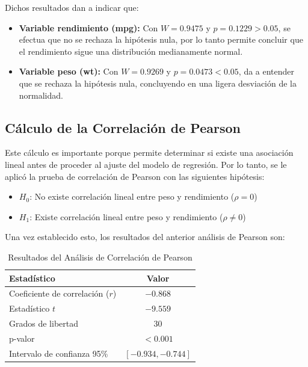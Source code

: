 \documentclass[12pt, letterpaper]{article}
\begin{document}
    \newpage
    Dichos resultados dan a indicar que:

    \begin{itemize}
        \item \textbf{Variable rendimiento (mpg):} Con $W = 0.9475$ y $p = 0.1229 > 0.05$, se efectua que no se rechaza la hipótesis nula, por lo tanto permite concluir que el rendimiento sigue una distribución medianamente normal.
        \item \textbf{Variable peso (wt):} Con $W = 0.9269$ y $p = 0.0473 < 0.05$, da a entender que
            se rechaza la hipótesis nula, concluyendo en una ligera desviación de la
            normalidad.
    \end{itemize}

    

    \subsection{Cálculo de la Correlación de Pearson}

    Este cálculo es importante porque permite determinar si existe una asociación lineal antes de proceder al ajuste del modelo de regresión. Por lo tanto, se le aplicó la prueba de correlación de Pearson con las siguientes hipótesis:
    \begin{itemize}
        \item $H_0$: No existe correlación lineal entre peso y rendimiento ($\rho = 0$)
        \item $H_1$: Existe correlación lineal entre peso y rendimiento ($\rho \neq 0$)
    \end{itemize}

    Una vez establecido esto, los resultados del anterior análisis de Pearson son:

    \begin{table}[H]
        \centering
        \caption{Resultados del Análisis de Correlación de Pearson}
        \begin{tabular}{@{}lc@{}}
            \toprule 
            \textbf{Estadístico} & \textbf{Valor} \\
            \midrule 
            Coeficiente de correlación ($r$) & $-0.868$ \\
            Estadístico $t$ & $-9.559$ \\
            Grados de libertad & 30 \\
            p-valor & $< 0.001$ \\
            Intervalo de confianza 95\% & $[-0.934, -0.744]$ \\
            \bottomrule
        \end{tabular}
        \label{tab:correlacion}
    \end{table}
\end{document}
